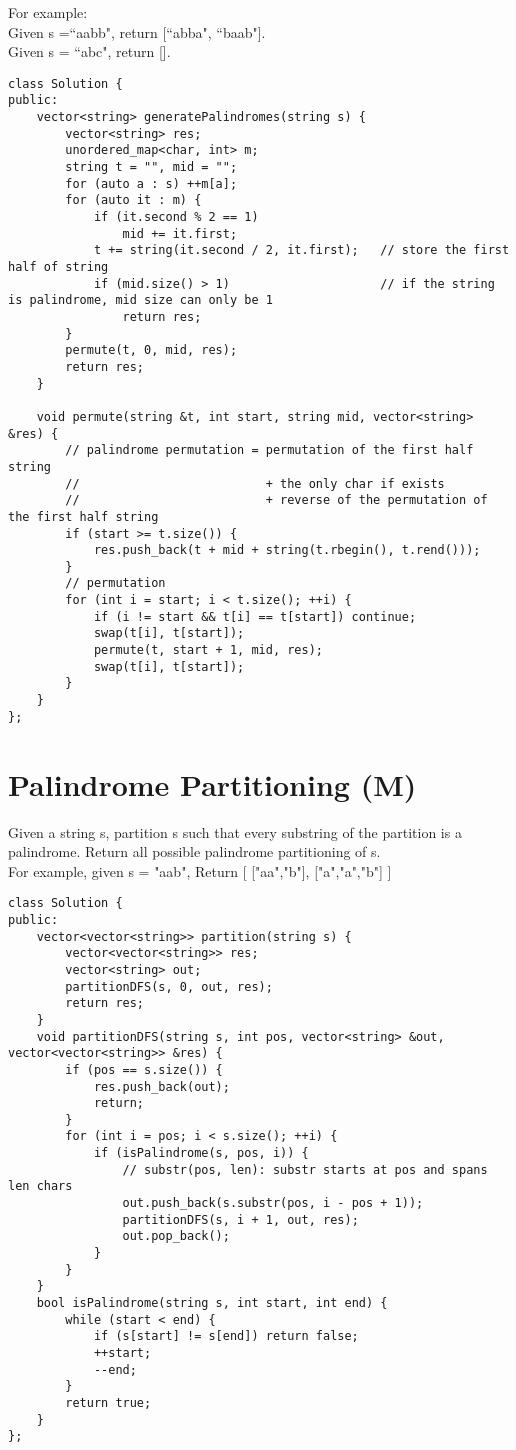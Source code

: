 For example:\\
Given s =``aabb", return [``abba", ``baab"].\\
Given s = ``abc", return [].\\

\begin{lstlisting}
class Solution {
public:
    vector<string> generatePalindromes(string s) {
        vector<string> res;
        unordered_map<char, int> m;
        string t = "", mid = "";
        for (auto a : s) ++m[a];
        for (auto it : m) {
            if (it.second % 2 == 1) 
                mid += it.first;
            t += string(it.second / 2, it.first);   // store the first half of string
            if (mid.size() > 1)                     // if the string is palindrome, mid size can only be 1
                return res;
        }
        permute(t, 0, mid, res);
        return res;
    }
    
    void permute(string &t, int start, string mid, vector<string> &res) {
        // palindrome permutation = permutation of the first half string 
        //                          + the only char if exists
        //                          + reverse of the permutation of the first half string
        if (start >= t.size()) {
            res.push_back(t + mid + string(t.rbegin(), t.rend()));
        } 
        // permutation
        for (int i = start; i < t.size(); ++i) {
            if (i != start && t[i] == t[start]) continue;
            swap(t[i], t[start]);
            permute(t, start + 1, mid, res);
            swap(t[i], t[start]);
        }
    }
};
\end{lstlisting}


\section{Palindrome Partitioning (M)}
Given a string s, partition s such that every substring of the partition is a palindrome. Return all possible palindrome partitioning of s.\\

For example, given s = "aab",
Return
[
  ["aa","b"],
  ["a","a","b"]
]\\

\begin{lstlisting}
class Solution {
public:
    vector<vector<string>> partition(string s) {
        vector<vector<string>> res;
        vector<string> out;
        partitionDFS(s, 0, out, res);
        return res;
    }
    void partitionDFS(string s, int pos, vector<string> &out, vector<vector<string>> &res) {
        if (pos == s.size()) {
            res.push_back(out);
            return;
        }
        for (int i = pos; i < s.size(); ++i) {
            if (isPalindrome(s, pos, i)) {
                // substr(pos, len): substr starts at pos and spans len chars
                out.push_back(s.substr(pos, i - pos + 1));
                partitionDFS(s, i + 1, out, res);
                out.pop_back();
            }
        }
    }
    bool isPalindrome(string s, int start, int end) {
        while (start < end) {
            if (s[start] != s[end]) return false;
            ++start;
            --end;
        }
        return true;
    }
};
\end{lstlisting}


